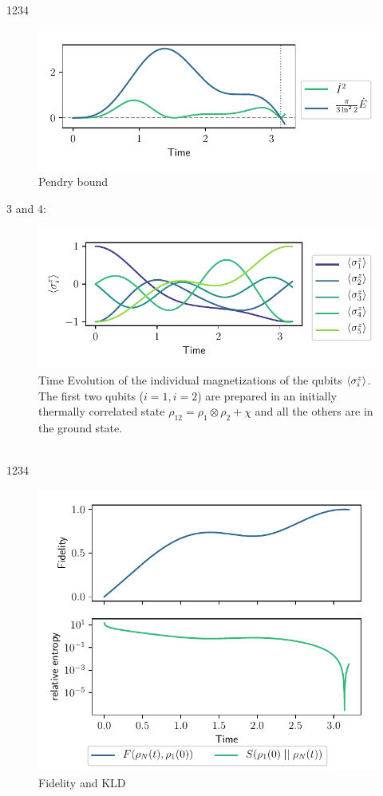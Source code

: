 \documentclass{book}
\numberwithin{equation}{section} %
\begin{document}
1234
\begin{figure}[h!]
    \centering
    \includegraphics{alltheplots/corr_at_diff_pos-new-alpha/23_pendry_grey_lines.pdf}
    \caption{Pendry bound \cite{BA_Pendry_1983}}
    \label{fig:corr23_pendry}
\end{figure}
3 and 4:
\begin{figure}[h!]
    \centering
    \includegraphics{alltheplots/corr_at_diff_pos-new-alpha/34_expval_z.pdf}
    \caption{Time Evolution of the individual magnetizations of the qubits
    $\expval{\sigma^z_i}$.
    The first two qubits ($i=1, i=2$) are prepared in an initially thermally correlated state $\rho_{12} = \rho_1 \otimes \rho_2 + \chi$
    and all the others are in the ground state.}
    \label{fig:corr34_expval_z}
\end{figure}\\
1234
\begin{figure}[h!]
    \centering
    \includegraphics{alltheplots/corr_at_diff_pos-new-alpha/34_fidelity_kld.pdf}
    \caption{Fidelity and KLD}
    \label{fig:corr34_fid_kld}
\end{figure}\\
\end{document}
